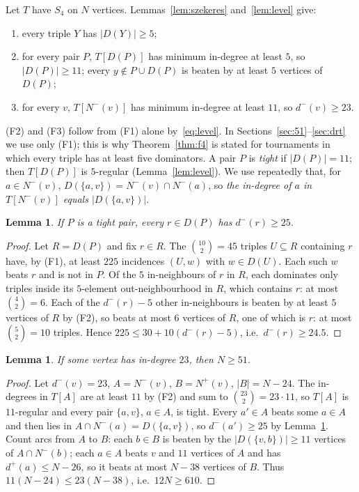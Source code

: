 \documentclass[11pt]{amsart}
\newtheorem{lemma}[theorem]{Lemma}
\theoremstyle{definition}
\theoremstyle{remark}
\newcommand{\D}{D}
\newcommand{\Nin}{N^{-}}
\newcommand{\Nout}{N^{+}}
\newcommand{\din}{d^{-}}
\newcommand{\dout}{d^{+}}
\newcommand{\abs}[1]{\lvert #1\rvert}
\begin{document}
Let $T$ have $S_4$ on $N$ vertices. Lemmas~\ref{lem:szekeres} and~\ref{lem:level} give:
\begin{enumerate}[label=(F\arabic*)]
\item every triple $Y$ has $\abs{\D(Y)}\ge5$;
\item for every pair $P$, $T[\D(P)]$ has minimum in-degree at least $5$, so $\abs{\D(P)}\ge11$; every $y\notin P\cup\D(P)$ is beaten
by at least $5$ vertices of $\D(P)$;
\item for every $v$, $T[\Nin(v)]$ has minimum in-degree at least $11$, so $\din(v)\ge23$.
\end{enumerate}
(F2) and (F3) follow from (F1) alone by~\eqref{eq:level}. In Sections~\ref{sec:51}--\ref{sec:drt} we use only (F1); this is why
Theorem~\ref{thm:f4} is stated for tournaments in which every triple has at least five dominators. A pair $P$ is \emph{tight} if
$\abs{\D(P)}=11$; then $T[\D(P)]$ is $5$-regular (Lemma~\ref{lem:level}). We use repeatedly that, for $a\in\Nin(v)$,
$\D(\{a,v\})=\Nin(v)\cap\Nin(a)$, so \emph{the in-degree of $a$ in $T[\Nin(v)]$ equals $\abs{\D(\{a,v\})}$}.

\begin{lemma}\label{lem:T}
If $P$ is a tight pair, every $r\in\D(P)$ has $\din(r)\ge25$.
\end{lemma}

\begin{proof}
Let $R=\D(P)$ and fix $r\in R$. The $\binom{10}2=45$ triples $U\subseteq R$ containing $r$ have, by (F1), at least $225$ incidences
$(U,w)$ with $w\in\D(U)$. Each such $w$ beats $r$ and is not in $P$. Of the $5$ in-neighbours of $r$ in $R$, each dominates only
triples inside its $5$-element out-neighbourhood in $R$, which contains $r$: at most $\binom42=6$. Each of the $\din(r)-5$ other
in-neighbours is beaten by at least $5$ vertices of $R$ by (F2), so beats at most $6$ vertices of $R$, one of which is $r$: at most
$\binom52=10$ triples. Hence $225\le30+10(\din(r)-5)$, i.e.\ $\din(r)\ge24.5$.
\end{proof}

\begin{lemma}\label{lem:23}
If some vertex has in-degree $23$, then $N\ge51$.
\end{lemma}

\begin{proof}
Let $\din(v)=23$, $A=\Nin(v)$, $B=\Nout(v)$, $\abs B=N-24$. The in-degrees in $T[A]$ are at least $11$ by (F2) and sum to
$\binom{23}2=23\cdot11$, so $T[A]$ is $11$-regular and every pair $\{a,v\}$, $a\in A$, is tight. Every $a'\in A$ beats some $a\in A$
and then lies in $A\cap\Nin(a)=\D(\{a,v\})$, so $\din(a')\ge25$ by Lemma~\ref{lem:T}. Count arcs from $A$ to $B$: each $b\in B$ is
beaten by the $\abs{\D(\{v,b\})}\ge11$ vertices of $A\cap\Nin(b)$; each $a\in A$ beats $v$ and $11$ vertices of $A$ and has
$\dout(a)\le N-26$, so it beats at most $N-38$ vertices of $B$. Thus $11(N-24)\le23(N-38)$, i.e.\ $12N\ge610$.
\end{proof}
\end{document}
